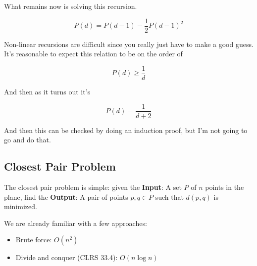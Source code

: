 \documentclass[../notes.tex]{subfiles}
\begin{document}
\begin{theorem}
What remains now is solving this recursion.


\begin{equation}
  P(d) = P(d-1) - \frac{1}{2} P(d-1)^2
\end{equation}

Non-linear recursions are difficult since you really just have to make a good guess. 
It's reasonable to expect this relation to be on the order of 

\begin{equation}
  P(d) \ge  \frac{1}{d}
\end{equation}

And then as it turns out it's 

\begin{equation}
  P(d) = \frac{1}{d+2}
\end{equation}

And then this can be checked by doing an induction proof, but I'm not going to go and do that.

\end{theorem}




\subsection{Closest Pair Problem}

The closest pair problem is simple: given the \textbf{Input}: A set $ P $ of $ n $ points in the plane, find the \textbf{Output}: A pair of points $ p, q \in P $ such that $ d(p,q) $ is minimized.


We are already familiar with a few approaches:

\begin{itemize}
    \item Brute force: $ O(n^2) $
    \item Divide and conquer (CLRS 33.4): $ O(n\log n) $
\end{itemize}
\end{document}
